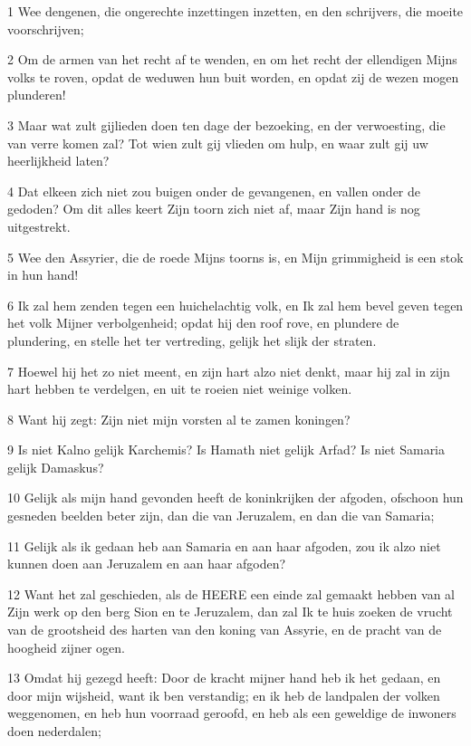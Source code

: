 \par 1 Wee dengenen, die ongerechte inzettingen inzetten, en den schrijvers, die moeite voorschrijven;
\par 2 Om de armen van het recht af te wenden, en om het recht der ellendigen Mijns volks te roven, opdat de weduwen hun buit worden, en opdat zij de wezen mogen plunderen!
\par 3 Maar wat zult gijlieden doen ten dage der bezoeking, en der verwoesting, die van verre komen zal? Tot wien zult gij vlieden om hulp, en waar zult gij uw heerlijkheid laten?
\par 4 Dat elkeen zich niet zou buigen onder de gevangenen, en vallen onder de gedoden? Om dit alles keert Zijn toorn zich niet af, maar Zijn hand is nog uitgestrekt.
\par 5 Wee den Assyrier, die de roede Mijns toorns is, en Mijn grimmigheid is een stok in hun hand!
\par 6 Ik zal hem zenden tegen een huichelachtig volk, en Ik zal hem bevel geven tegen het volk Mijner verbolgenheid; opdat hij den roof rove, en plundere de plundering, en stelle het ter vertreding, gelijk het slijk der straten.
\par 7 Hoewel hij het zo niet meent, en zijn hart alzo niet denkt, maar hij zal in zijn hart hebben te verdelgen, en uit te roeien niet weinige volken.
\par 8 Want hij zegt: Zijn niet mijn vorsten al te zamen koningen?
\par 9 Is niet Kalno gelijk Karchemis? Is Hamath niet gelijk Arfad? Is niet Samaria gelijk Damaskus?
\par 10 Gelijk als mijn hand gevonden heeft de koninkrijken der afgoden, ofschoon hun gesneden beelden beter zijn, dan die van Jeruzalem, en dan die van Samaria;
\par 11 Gelijk als ik gedaan heb aan Samaria en aan haar afgoden, zou ik alzo niet kunnen doen aan Jeruzalem en aan haar afgoden?
\par 12 Want het zal geschieden, als de HEERE een einde zal gemaakt hebben van al Zijn werk op den berg Sion en te Jeruzalem, dan zal Ik te huis zoeken de vrucht van de grootsheid des harten van den koning van Assyrie, en de pracht van de hoogheid zijner ogen.
\par 13 Omdat hij gezegd heeft: Door de kracht mijner hand heb ik het gedaan, en door mijn wijsheid, want ik ben verstandig; en ik heb de landpalen der volken weggenomen, en heb hun voorraad geroofd, en heb als een geweldige de inwoners doen nederdalen;
